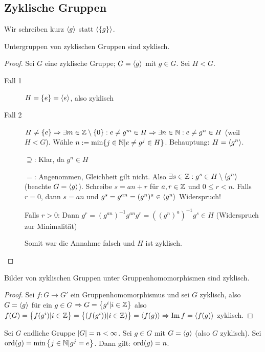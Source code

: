 \documentclass[12pt,a4paper]{scrartcl}
\begin{document}
\subsection{Zyklische Gruppen} \label{ch:zyklisch}
Wir schreiben kurz $\langle g\rangle$ statt $\langle\{g\}\rangle$.
\begin{satz}
	Untergruppen von zyklischen Gruppen sind zyklisch.
\end{satz}

\begin{proof}
	Sei $G$ eine zyklische Gruppe; $G = \langle g\rangle$ mit $g\in G$. Sei $H<G$.\begin{description}
		\item[Fall 1] $H = \{e\} = \langle e\rangle$, also zyklisch
		\item[Fall 2] $H\neq \{e\}\Rightarrow \exists m\in \mathbb Z\setminus\{0\}: e\neq g^m\in H\Rightarrow \exists n\in \mathbb N: e\neq g^n\in H$ (weil $H<G$). Wähle $n := \min\{j\in \mathbb N|e\neq g^j\in H\}$. Behauptung: $H = \langle g^n\rangle$.
		
		\glqq$\supseteq$\grqq: Klar, da $g^n\in H$
		
		\glqq$=$\grqq: Angenommen, Gleichheit gilt nicht. Also $\exists s\in \mathbb Z: g^s\in H\setminus\langle g^n\rangle$ (beachte $G = \langle g\rangle$). Schreibe $s = an+r$ für $a,r\in \mathbb Z$ und $0\leq r<n$. Falls $r = 0$, dann $s = an$ und $g^s = g^{an} = (g^n)^a\in \langle g^n\rangle$ Widerspruch!
		
		Falls $r>0$: Dann $g^r = (g^{an})^{-1}g^{an}g^r = ((g^n)^a)^{-1}g^s\in H$ (Widerspruch zur Minimalität)
		
		Somit war die Annahme falsch und $H$ ist zyklisch.
  \qedhere
	\end{description}
\end{proof}


\begin{lem}
	Bilder von zyklischen Gruppen unter Gruppenhomomorphismen sind zyklisch.
\end{lem}

\begin{proof}
	Sei $f: G \rightarrow G'$ ein Gruppenhomomorphismus und sei $G$ zyklisch, also $G = \langle g\rangle$ für ein $g \in G$ $\Rightarrow G = \left\lbrace g^i | i \in \mathbb Z \right\rbrace$ also $f(G) = \left\lbrace f(g^i) | i\in \mathbb Z \right\rbrace = \left\lbrace (f(g^i)) | i \in \mathbb Z)\right\rbrace = \langle f(g)\rangle \Rightarrow \operatorname{Im} f = \langle f(g)\rangle$ zyklisch.
\end{proof}

\begin{lem} \label{lem:ord}
	Sei $G$ endliche Gruppe $\lvert G\rvert = n < \infty$. Sei $g \in G$ mit $G=\langle g\rangle$ \textup(also $G$ zyklisch\textup).
	Sei $\operatorname{ord}(g) = \min \left\lbrace j \in \mathbb N | g^j = e\right\rbrace $.
	Dann gilt: $\operatorname{ord}(g) = n$. 
\end{lem}
\end{document}
